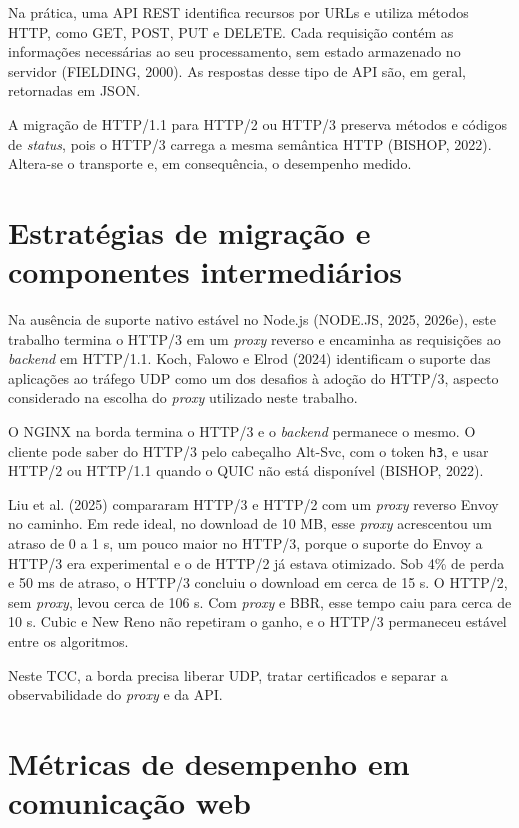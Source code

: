 Na prática, uma API REST identifica recursos por URLs e utiliza métodos HTTP, como GET, POST, PUT e DELETE. Cada requisição contém as informações necessárias ao seu processamento, sem estado armazenado no servidor (FIELDING, 2000). As respostas desse tipo de API são, em geral, retornadas em JSON.

A migração de HTTP/1.1 para HTTP/2 ou HTTP/3 preserva métodos e códigos de \textit{status}, pois o HTTP/3 carrega a mesma semântica HTTP (BISHOP, 2022). Altera-se o transporte e, em consequência, o desempenho medido.

\section{Estratégias de migração e componentes intermediários}

Na ausência de suporte nativo estável no Node.js (NODE.JS, 2025, 2026e), este trabalho termina o HTTP/3 em um \textit{proxy} reverso e encaminha as requisições ao \textit{backend} em HTTP/1.1. Koch, Falowo e Elrod (2024) identificam o suporte das aplicações ao tráfego UDP como um dos desafios à adoção do HTTP/3, aspecto considerado na escolha do \textit{proxy} utilizado neste trabalho.

O NGINX na borda termina o HTTP/3 e o \textit{backend} permanece o mesmo. O cliente pode saber do HTTP/3 pelo cabeçalho Alt-Svc, com o token \texttt{h3}, e usar HTTP/2 ou HTTP/1.1 quando o QUIC não está disponível (BISHOP, 2022).

Liu et al. (2025) compararam HTTP/3 e HTTP/2 com um \textit{proxy} reverso Envoy no caminho. Em rede ideal, no download de 10 MB, esse \textit{proxy} acrescentou um atraso de 0 a 1 s, um pouco maior no HTTP/3, porque o suporte do Envoy a HTTP/3 era experimental e o de HTTP/2 já estava otimizado. Sob 4\% de perda e 50 ms de atraso, o HTTP/3 concluiu o download em cerca de 15 s. O HTTP/2, sem \textit{proxy}, levou cerca de 106 s. Com \textit{proxy} e BBR, esse tempo caiu para cerca de 10 s. Cubic e New Reno não repetiram o ganho, e o HTTP/3 permaneceu estável entre os algoritmos.

Neste TCC, a borda precisa liberar UDP, tratar certificados e separar a observabilidade do \textit{proxy} e da API.

\section{Métricas de desempenho em comunicação web}\label{sec:metricas}

